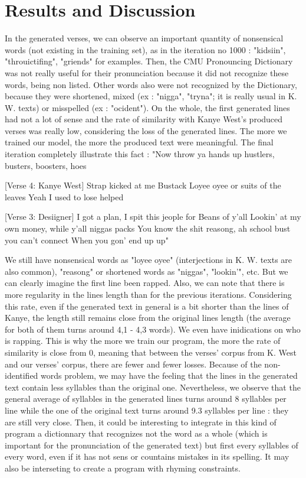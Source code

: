 \documentclass[12pt,a4paper]{article}
\begin{document}
\section{Results and Discussion}

In the generated verses, we can observe an important quantity of nonsensical words (not existing in the training set), as in the iteration no 1000 : "kidsiin", "throuictifing", "griends" for examples. Then, the CMU Pronouncing Dictionary was not really useful for their pronunciation because it did not recognize these words, being non listed. Other words also were not recognized by the Dictionary, because they were shortened, mixed (ex : "nigga", "tryna"; it is really usual in K. W. texts) or misspelled (ex : "ocident"). On the whole, the first generated lines had not a lot of sense and the rate of similarity with Kanye West's produced verses was really low, considering the loss of the generated lines. The more we trained our model, the more the produced text were meaningful. The final iteration completely illustrate this fact : 
"Now throw ya hands up hustlers, busters, boosters, hoes

[Verse 4: Kanye West]
Strap kicked at me Bustack
Loyee oyee or suits of the leaves
Yeah I used to lose helped

[Verse 3: Desiigner]
I got a plan, I spit this jeople for Beans of y'all
Lookin' at my own money, while y'all niggas packs
You know the shit reasong, ah school bust you can't connect
When you gon' end up up"

We still have nonsensical words as "loyee oyee" (interjections in K. W. texts are also common), "reasong" or shortened words as "niggas", "lookin'", etc. But we can clearly imagine the first line been rapped. Also, we can note that there is more regularity in the lines length than for the previous iterations. Considering this rate, even if the generated text in general is a bit shorter than the lines of Kanye, the length still remains close from the original lines length (the average for both of them turns around 4,1 - 4,3 words). We even have inidications on who is rapping. This is why the more we train our program, the more the rate of similarity is close from 0, meaning that between the verses' corpus from K. West and our verses' corpus, there are fewer and fewer losses. Because of the non-identified words problem, we may have the feeling that the lines in the generated text contain less syllables than the original one. Nevertheless, we observe that the general average of syllables in the generated lines turns around 8 syllables per line while the one of the original text turns around 9.3 syllables per line : they are still very close. Then, it could be interesting to integrate in this kind of program a dictionnary that recognizes not the word as a whole (which is important for the pronunciation of the generated text) but first every syllables of every word, even if it has not sens or countains mistakes in its spelling. It may also be interseting to create a program with rhyming constraints.



\end{document}

